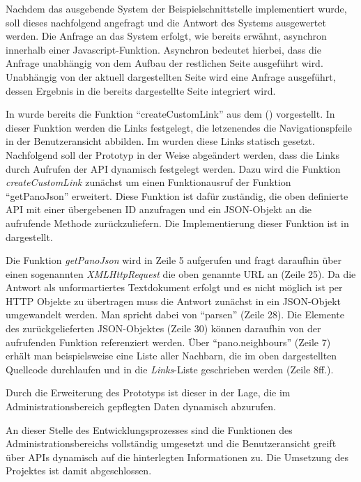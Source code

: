 Nachdem das ausgebende System der Beispielschnittstelle implementiert wurde,
soll dieses nachfolgend angefragt und die Antwort des Systems ausgewertet
werden. Die Anfrage an das System erfolgt, wie bereits erwähnt, asynchron
innerhalb einer Javascript-Funktion. Asynchron bedeutet hierbei, dass die
Anfrage unabhängig von dem Aufbau der restlichen Seite ausgeführt wird.
Unabhängig von der aktuell dargestellten Seite wird eine Anfrage ausgeführt,
dessen Ergebnis in die bereits dargestellte Seite integriert wird.

In  wurde bereits die Funktion "`createCustomLink"' aus dem
() vorgestellt. In dieser Funktion
werden die Links festgelegt, die letzenendes die Navigationspfeile in der
Benutzeransicht abbilden. Im  wurden diese Links statisch
gesetzt. Nachfolgend soll der Prototyp in der Weise abgeändert werden, dass die
Links durch Aufrufen der API dynamisch festgelegt werden. Dazu wird die Funktion
\textit{createCustomLink} zunächst um einen Funktionausruf der Funktion
"`getPanoJson"' erweitert. Diese Funktion ist dafür zuständig, die oben
definierte API mit einer übergebenen ID anzufragen und ein JSON-Objekt an die
aufrufende Methode zurückzuliefern. Die Implementierung dieser Funktion ist in
 dargestellt.

\clearpage



Die Funktion \textit{getPanoJson} wird in Zeile 5 aufgerufen und fragt daraufhin
über einen sogenannten \textit{XMLHttpRequest} die oben genannte URL an (Zeile
25). Da die Antwort als unformartiertes Textdokument erfolgt und es nicht
möglich ist per HTTP Objekte zu übertragen muss die Antwort zunächst in ein
JSON-Objekt umgewandelt werden. Man spricht dabei von "`parsen"' (Zeile 28). Die
Elemente des zurückgelieferten JSON-Objektes (Zeile 30) können daraufhin von der
aufrufenden Funktion referenziert werden. Über "`pano.neighbours"' (Zeile 7)
erhält man beispielsweise eine Liste aller Nachbarn, die im oben dargestellten
Quellcode durchlaufen und in die \textit{Links}-Liste geschrieben werden (Zeile
8ff.).

Durch die Erweiterung des Prototyps ist dieser in der Lage, die im
Administrationsbereich gepflegten Daten dynamisch abzurufen.

An dieser Stelle des Entwicklungsprozesses sind die Funktionen des
Administrationsbereichs vollständig umgesetzt und die Benutzeransicht greift
über APIs dynamisch auf die hinterlegten Informationen zu. Die Umsetzung des
Projektes ist damit abgeschlossen.